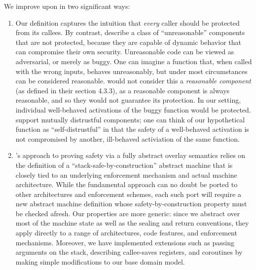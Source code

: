 \documentclass[acmsmall,review,anonymous]{acmart}\settopmatter{printfolios=true,printccs=false,printacmref=false}
\begin{document}
{{We improve upon \citet{SkorstengaardSTKJFP} in two significant ways:
\begin{enumerate}[label=(\roman*)]
\item Our definition captures the intuition that {\em
  every} caller should be protected from its callees.  By contrast,
  \citet{SkorstengaardSTKJFP} describe a class of ``unreasonable'' components
  that are not protected, because they are capable of dynamic behavior that can compromise
  their own security. Unreasonable code can be viewed as adversarial, or merely as
  buggy. One can imagine a function that, when called with the wrong
  inputs, behaves unreasonably, but under most circumstances can be
  considered reasonable. \citet{SkorstengaardSTKJFP} would not consider this a
  {\em reasonable component} (as defined in their section 4.3.3), as a reasonable
  component is always reasonable, and so they
  would not guarantee its protection. In our setting, individual
  well-behaved activations of the buggy function would be protected.
  \citet{SkorstengaardSTKJFP} support mutually distrustful
  components; one can think of our hypothetical
  function as ``self-distrustful'' in that the safety of a well-behaved activation
  is not compromised by another, ill-behaved activiation of the same function.

\item \citet{SkorstengaardSTKJFP}'s approach to proving safety via a fully
  abstract overlay
  semantics relies on the definition of a ``stack-safe-by-construction''
  abstract machine that is closely tied to an underlying enforcement
  mechanism and actual machine architecture.
  While the fundamental approach can no doubt be ported to other architectures and enforcement
  schemes, each such port will require a new abstract machine definition whose
  safety-by-construction property must be checked afresh.
  Our properties are more generic: since we abstract over most of the machine
  state as well as the sealing and return conventions, they apply directly
  to a range of architectures, code features, and enforcement mechanisms.
  Moreover, we have implemented extensions such as passing arguments on the stack,
  describing callee-saves registers, and coroutines by making simple modifications
  to our base domain model.


\end{enumerate}}}
\end{document}
